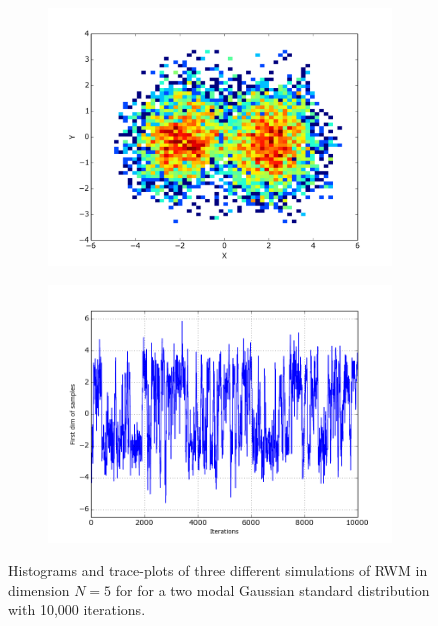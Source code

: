 \begin{figure}
\begin{center}
  \begin{subfigure}{.5\textwidth}
    \centering
    \includegraphics[width=\textwidth]{figure_CC_RWM_inter_Histo}
  \end{subfigure}%
  \begin{subfigure}{.5\textwidth}
    \centering
    \includegraphics[width=\textwidth]{figure_CC_RWM_inter_2}
  \end{subfigure}  
  \vspace*{1mm}
  \label{fig:HeuristicHistoPlotRWM-medium}
  
 \end{center}
 
  \caption{Histograms and trace-plots of three different simulations of RWM in dimension $N=5$ for for a two modal Gaussian standard distribution with 10,000 iterations.}
  \label{fig:HeuristicHistoPlotRWM}
\end{figure}


